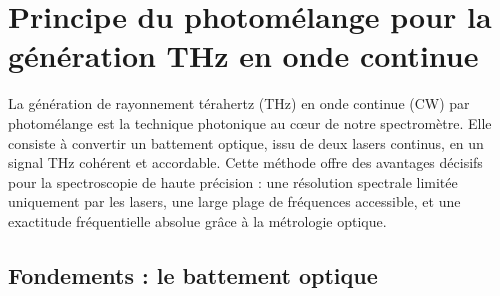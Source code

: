 
















\section{ Principe du photomélange pour la génération THz en onde continue}

La génération de rayonnement térahertz (THz) en onde continue (CW) par photomélange est la technique photonique au cœur de notre spectromètre. Elle consiste à convertir un battement optique, issu de deux lasers continus, en un signal THz cohérent et accordable. Cette méthode offre des avantages décisifs pour la spectroscopie de haute précision : une résolution spectrale limitée uniquement par les lasers, une large plage de fréquences accessible, et une exactitude fréquentielle absolue grâce à la métrologie optique.

\subsection{ Fondements : le battement optique}

